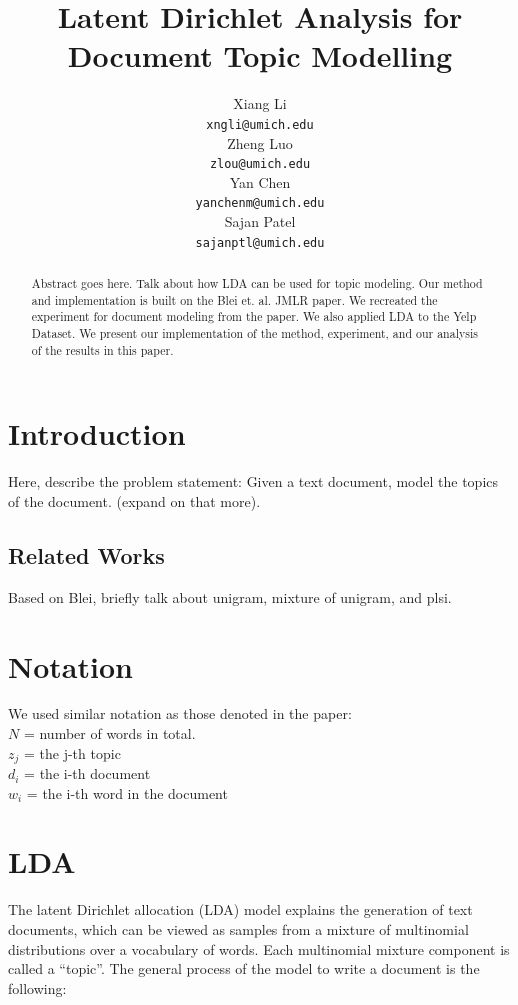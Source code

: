 \documentclass{article} %
\title{Latent Dirichlet Analysis for Document Topic Modelling}
\author{
Xiang Li\\
\texttt{xngli@umich.edu} \\
\And
Zheng Luo \\
\texttt{zlou@umich.edu} \\
\AND
Yan Chen\\
\texttt{yanchenm@umich.edu} \\
\And
Sajan Patel\\
\texttt{sajanptl@umich.edu} \\
}
\begin{document}
\maketitle

\begin{abstract}
Abstract goes here. Talk about how LDA can be used for topic modeling. Our method and implementation is
built on the Blei et. al. JMLR paper. We recreated the experiment for document modeling from the paper.
We also applied LDA to the Yelp Dataset. We present our implementation of the method, experiment, and
our analysis of the results in this paper.
\end{abstract}

\section{Introduction}
Here, describe the problem statement: Given a text document, model the topics of the document. (expand on that more).

\subsection{Related Works}
Based on Blei, briefly talk about unigram, mixture of unigram, and plsi.

\section{Notation}
We used similar notation as those denoted in the paper: \\
$N$ =  number of words in total.\\
$z_j$ = the j-th topic\\
$d_i$ = the i-th document\\
$w_i$ = the i-th word in the document\\

\section{LDA}
The latent Dirichlet allocation (LDA) model explains the generation of text documents, which can be viewed as samples from a mixture of multinomial distributions over a vocabulary of words. Each multinomial mixture component is called a “topic”. The general process of the model to write a document is the following:
\end{document}
